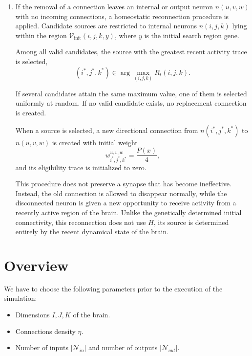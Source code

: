\documentclass[12pt,a4paper]{article}
\begin{document}
\begin{enumerate}
\begin{figure}[H]
		\caption{\footnotesize{Temporal order of the operations affecting existing connections. Input and internal sources share the plasticity steps but differ in transmission and in the final weight treatment.}}
	\end{figure}

	\item If the removal of a connection leaves an internal or output neuron $n(u,v,w)$ with no incoming connections, a homeostatic reconnection procedure is applied. Candidate sources are restricted to internal neurons $n(i,j,k)$ lying within the region $\mathcal{V}_{\text{init}}(i, j, k, y)$, where $y$ is the initial search region gene.
	
	Among all valid candidates, the source with the greatest recent activity trace is selected,
	$$(i^\ast,j^\ast,k^\ast) \in \arg\max_{(i,j,k)} R_t(i,j,k).$$

	If several candidates attain the same maximum value, one of them is selected uniformly at random. If no valid candidate exists, no replacement connection is created.

	When a source is selected, a new directional connection from $n(i^\ast,j^\ast,k^\ast)$ to $n(u,v,w)$ is created with initial weight 
	$$w_{i^\ast,j^\ast,k^\ast}^{u,v,w}=\frac{P(x)}{4},$$
and its eligibility trace is initialized to zero.

	This procedure does not preserve a synapse that has become ineffective. Instead, the old connection is allowed to disappear normally, while the disconnected neuron is given a new opportunity to receive activity from a recently active region of the brain. Unlike the genetically determined initial connectivity, this reconnection does not use $H$, its source is determined entirely by the recent dynamical state of the brain.
	
\end{enumerate}

\section{Overview}
	We have to choose the following parameters prior to the execution of the simulation:
	\begin{itemize}
		\item Dimensions $I, J, K$ of the brain.
		\item Connections density $\eta$.
		\item Number of inputs $|\mathcal{N}_{in}|$ and number of outputs $|\mathcal{N}_{out}|$.
	\end{itemize}
	
\end{document}
